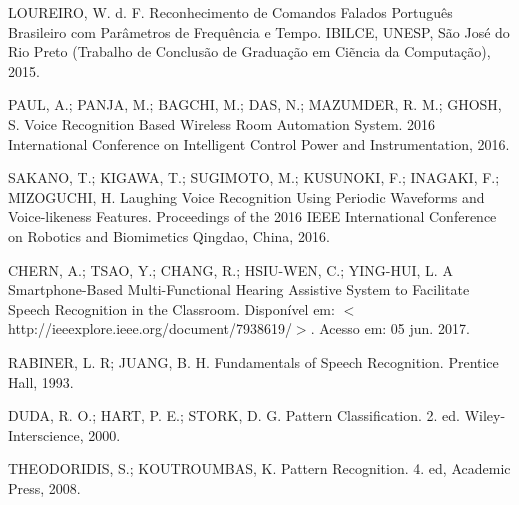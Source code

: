 \documentclass[a4paper,12pt,twoside,openright]{report}
\begin{document}
\begin{thebibliography}{00}
\begin{singlespace}
	LOUREIRO, W. d. F. Reconhecimento de Comandos Falados Portugu\^{e}s Brasileiro com Par\^{a}metros de Frequ\^{e}ncia e Tempo. IBILCE, UNESP, S\~{a}o Jos\'{e} do Rio Preto (Trabalho de Conclus\~{a}o de Gradua{\c c}\~{a}o em Ci\~{e}ncia da Computa{\c c}\~{a}o), 2015.
\end{singlespace}

\begin{singlespace}
	PAUL, A.; PANJA, M.; BAGCHI, M.; DAS, N.; MAZUMDER, R. M.; GHOSH, S. Voice Recognition Based Wireless Room Automation
	System. 2016 International Conference on Intelligent Control Power and Instrumentation, 2016.
\end{singlespace}

\begin{singlespace}
	SAKANO, T.; KIGAWA, T.; SUGIMOTO, M.; KUSUNOKI, F.; INAGAKI, F.; MIZOGUCHI, H. Laughing Voice Recognition Using Periodic Waveforms and Voice-likeness Features. Proceedings of the 2016 IEEE International Conference on Robotics and Biomimetics Qingdao, China, 2016.
\end{singlespace}

\begin{singlespace}
	CHERN, A.; TSAO, Y.; CHANG, R.; HSIU-WEN, C.; YING-HUI, L. A Smartphone-Based Multi-Functional Hearing Assistive System to Facilitate Speech Recognition in the Classroom. Dispon\'{i}vel em: $<$http://ieeexplore.ieee.org/document/7938619/$>$. Acesso em: 05 jun. 2017.
\end{singlespace}

\begin{singlespace}
	RABINER, L. R; JUANG, B. H. Fundamentals of Speech Recognition. Prentice Hall, 1993.
\end{singlespace}

\begin{singlespace}
	DUDA, R. O.; HART, P. E.; STORK, D. G. Pattern Classification. 2. ed. Wiley-Interscience, 2000.
\end{singlespace}

\begin{singlespace}
	THEODORIDIS, S.; KOUTROUMBAS, K. Pattern Recognition. 4. ed, Academic Press, 2008.
\end{singlespace}


\end{thebibliography}
\end{document}
